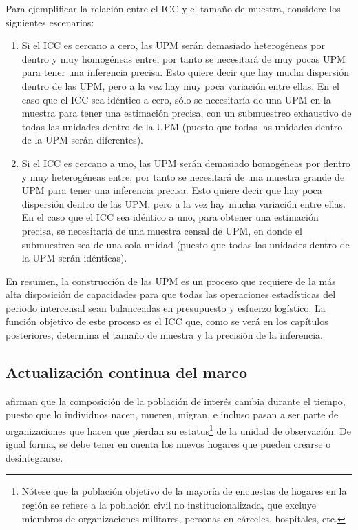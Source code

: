 \documentclass[
  10pt,
  spanish,
]{book}
\begin{document}
Para ejemplificar la relación entre el ICC y el tamaño de muestra, considere los siguientes escenarios:

\begin{enumerate}
\def\labelenumi{\arabic{enumi}.}
\item
  Si el ICC es cercano a cero, las UPM serán demasiado heterogéneas por dentro y muy homogéneas entre, por tanto se necesitará de muy pocas UPM para tener una inferencia precisa. Esto quiere decir que hay mucha dispersión dentro de las UPM, pero a la vez hay muy poca variación entre ellas. En el caso que el ICC sea idéntico a cero, sólo se necesitaría de una UPM en la muestra para tener una estimación precisa, con un submuestreo exhaustivo de todas las unidades dentro de la UPM (puesto que todas las unidades dentro de la UPM serán diferentes).
\item
  Si el ICC es cercano a uno, las UPM serán demasiado homogéneas por dentro y muy heterogéneas entre, por tanto se necesitará de una muestra grande de UPM para tener una inferencia precisa. Esto quiere decir que hay poca dispersión dentro de las UPM, pero a la vez hay mucha variación entre ellas. En el caso que el ICC sea idéntico a uno, para obtener una estimación precisa, se necesitaría de una muestra censal de UPM, en donde el submuestreo sea de una sola unidad (puesto que todas las unidades dentro de la UPM serán idénticas).
\end{enumerate}

En resumen, la construcción de las UPM es un proceso que requiere de la más alta disposición de capacidades para que todas las operaciones estadísticas del periodo intercensal sean balanceadas en presupuesto y esfuerzo logístico. La función objetivo de este proceso es el ICC que, como se verá en los capítulos posteriores, determina el tamaño de muestra y la precisión de la inferencia.

\hypertarget{actualizaciuxf3n-continua-del-marco}{%
\subsection{Actualización continua del marco}\label{actualizaciuxf3n-continua-del-marco}}

\citet[pág. 105]{Duncan_Kalton_1987} afirman que la composición de la población de interés cambia durante el tiempo, puesto que lo individuos nacen, mueren, migran, e incluso pasan a ser parte de organizaciones que hacen que pierdan su estatus\footnote{Nótese que la población objetivo de la mayoría de encuestas de hogares en la región se refiere a la población civil no institucionalizada, que excluye miembros de organizaciones militares, personas en cárceles, hospitales, etc.} de la unidad de observación. De igual forma, se debe tener en cuenta los nuevos hogares que pueden crearse o desintegrarse.
\end{document}
